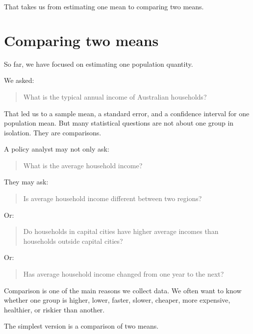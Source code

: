 \documentclass[
  letterpaper,
  DIV=11,
  numbers=noendperiod]{scrreprt}
\begin{document}
That takes us from estimating one mean to comparing two means.

\section{Comparing two means}\label{comparing-two-means}

So far, we have focused on estimating one population quantity.

We asked:

\begin{quote}
What is the typical annual income of Australian households?
\end{quote}

That led us to a sample mean, a standard error, and a confidence
interval for one population mean. But many statistical questions are not
about one group in isolation. They are comparisons.

A policy analyst may not only ask:

\begin{quote}
What is the average household income?
\end{quote}

They may ask:

\begin{quote}
Is average household income different between two regions?
\end{quote}

Or:

\begin{quote}
Do households in capital cities have higher average incomes than
households outside capital cities?
\end{quote}

Or:

\begin{quote}
Has average household income changed from one year to the next?
\end{quote}

Comparison is one of the main reasons we collect data. We often want to
know whether one group is higher, lower, faster, slower, cheaper, more
expensive, healthier, or riskier than another.

The simplest version is a comparison of two means.
\end{document}

